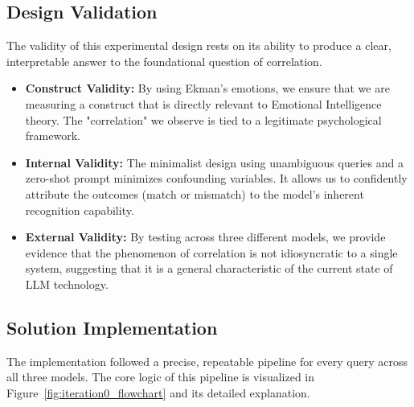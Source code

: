 \subsection{Design Validation}   
The validity of this experimental design rests on its ability to produce a clear, interpretable answer to the foundational question of correlation.
\begin{itemize}
    \item \textbf{Construct Validity:} By using Ekman's emotions, we ensure that we are measuring a construct that is directly relevant to Emotional Intelligence theory. The "correlation" we observe is tied to a legitimate psychological framework.
    \item \textbf{Internal Validity:} The minimalist design using unambiguous queries and a zero-shot prompt minimizes confounding variables. It allows us to confidently attribute the outcomes (match or mismatch) to the model's inherent recognition capability.
    \item \textbf{External Validity:} By testing across three different models, we provide evidence that the phenomenon of correlation is not idiosyncratic to a single system, suggesting that it is a general characteristic of the current state of LLM technology.
\end{itemize}

\subsection{Solution Implementation}
The implementation followed a precise, repeatable pipeline for every query across all three models. The core logic of this pipeline is visualized in Figure~\ref{fig:iteration0_flowchart} and its detailed explanation.

